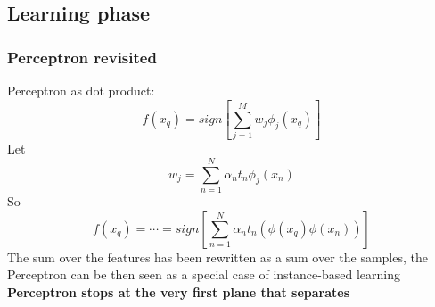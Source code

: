 \subsection{Learning phase}
\subsubsection{Perceptron revisited}
    Perceptron as dot product:
    $$f(x_q)=sign\left[\sum_{j=1}^{M}w_j\phi_j(x_q)\right]$$
    Let
    $$w_j=\sum_{n=1}^N\alpha_nt_n\phi_j(x_n)$$
    So
    $$f(x_q)=\cdots=sign\left[\sum_{n=1}^{N}\alpha_nt_n(\phi(x_q)\phi(x_n))\right]$$
    The sum over the features has been rewritten as a sum over the samples, the Perceptron can be then seen as a special case of instance-based learning\\
    \textbf{Perceptron stops at the very first plane that separates}

